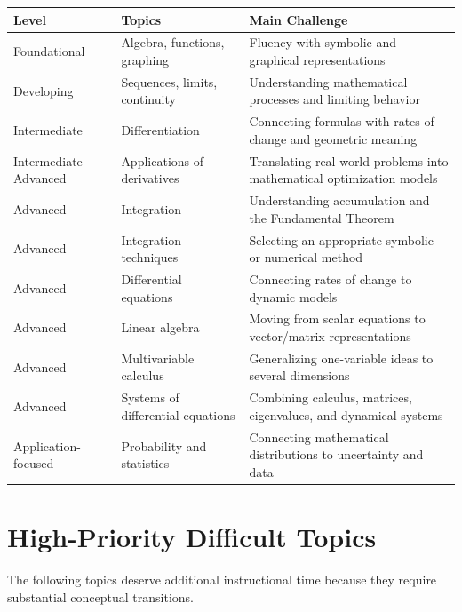 \documentclass[11pt]{article}
\begin{document}
\begin{longtable}{p{} p{} p{}}
\toprule
\textbf{Level} & \textbf{Topics} & \textbf{Main Challenge}\\
\midrule
Foundational &
Algebra, functions, graphing &
Fluency with symbolic and graphical representations\\
\addlinespace
Developing &
Sequences, limits, continuity &
Understanding mathematical processes and limiting behavior\\
\addlinespace
Intermediate &
Differentiation &
Connecting formulas with rates of change and geometric meaning\\
\addlinespace
Intermediate--Advanced &
Applications of derivatives &
Translating real-world problems into mathematical optimization models\\
\addlinespace
Advanced &
Integration &
Understanding accumulation and the Fundamental Theorem\\
\addlinespace
Advanced &
Integration techniques &
Selecting an appropriate symbolic or numerical method\\
\addlinespace
Advanced &
Differential equations &
Connecting rates of change to dynamic models\\
\addlinespace
Advanced &
Linear algebra &
Moving from scalar equations to vector/matrix representations\\
\addlinespace
Advanced &
Multivariable calculus &
Generalizing one-variable ideas to several dimensions\\
\addlinespace
Advanced &
Systems of differential equations &
Combining calculus, matrices, eigenvalues, and dynamical systems\\
\addlinespace
Application-focused &
Probability and statistics &
Connecting mathematical distributions to uncertainty and data\\
\bottomrule
\end{longtable}


\section{High-Priority Difficult Topics}

The following topics deserve additional instructional time because
they require substantial conceptual transitions.
\end{document}
